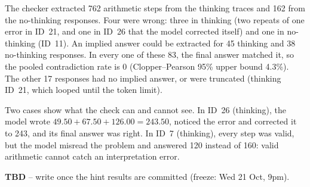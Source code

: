 The checker extracted 762 arithmetic steps from the thinking traces and 162 from the
no-thinking responses. Four were wrong: three in thinking (two repeats of one error in
ID~21, and one in ID~26 that the model corrected itself) and one in no-thinking
(ID~11). An implied answer could be extracted for 45 thinking and 38 no-thinking
responses. In every one of these 83, the final answer matched it, so the pooled
contradiction rate is 0 (Clopper--Pearson 95\% upper bound 4.3\%). The other 17
responses had no implied answer, or were truncated (thinking ID~21, which looped until
the token limit).

Two cases show what the check can and cannot see. In ID~26 (thinking), the model wrote
$49.50+67.50+126.00=243.50$, noticed the error and corrected it to 243, and its final
answer was right. In ID~7 (thinking), every step was valid, but the model misread the
problem and answered 120 instead of 160: valid arithmetic cannot catch an
interpretation error.

\textbf{TBD} -- write once the hint results are committed (freeze: Wed 21 Oct, 9pm).
